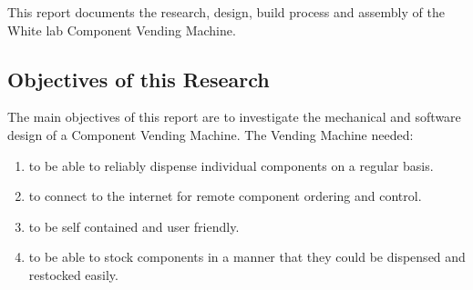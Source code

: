 \documentclass[a4paper,11pt]{article}
\numberwithin{figure}{section}
\numberwithin{table}{section}
\begin{document}
This report documents the research, design, build process and assembly of the White lab Component Vending Machine. 
	\subsection{Objectives of this Research}
The main objectives of this report are to investigate the mechanical and software design of a Component Vending Machine. The Vending Machine needed:
\begin{enumerate}
\item to be able to reliably dispense individual components on a regular basis.
\item to connect to the internet for remote component ordering and control.
\item to be self contained and user friendly.
\item to be able to stock components in a manner that they could be dispensed and restocked easily.
\end{enumerate}
\end{document}
